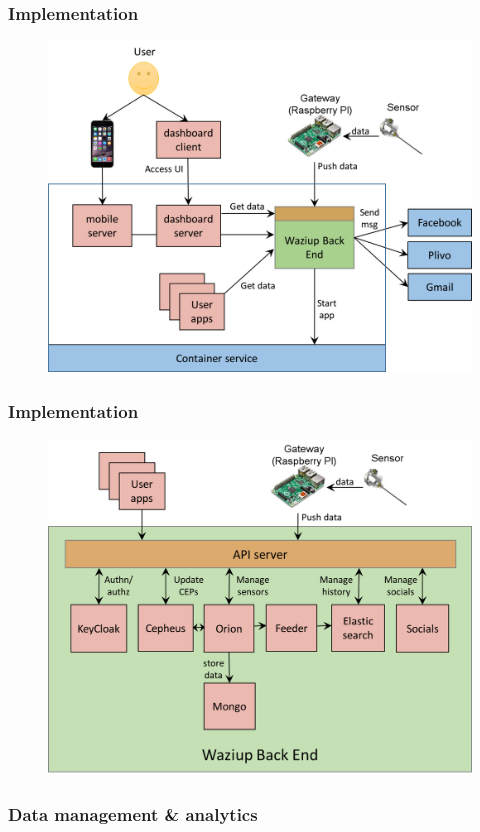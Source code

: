 \documentclass{beamer}
\begin{document}
\begin{frame}
\frametitle{Implementation}

  \begin{figure} 
  \centering  
  \includegraphics[width=.8\linewidth]{figures/CloudEnv.png}   
  \label{fig-implem}  
  \end{figure}

\end{frame}


\begin{frame}
\frametitle{Implementation}
 

  \begin{figure}
  \centering  
  \includegraphics[width=.8\linewidth]{figures/BackEnd.png}   
  \label{fig-implem}  
  \end{figure}
\end{frame}

\begin{frame}
\frametitle{Data management \& analytics}

    
\end{frame}
\end{document}
